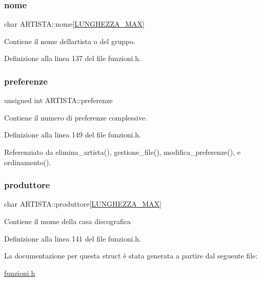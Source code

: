 \subsubsection{\texorpdfstring{nome}{nome}}
{\footnotesize\ttfamily char A\+R\+T\+I\+S\+T\+A\+::nome\mbox{[}\hyperlink{funzioni_8h_a2cdd71b92d6e869f8b094e32a6da6a62}{L\+U\+N\+G\+H\+E\+Z\+Z\+A\+\_\+\+M\+AX}\mbox{]}}

Contiene il nome dell\textquotesingle{}artista o del gruppo. 

Definizione alla linea 137 del file funzioni.\+h.

\mbox{\label{struct_a_r_t_i_s_t_a_a864c672ed1a5c81d1daf02093e11eb05}} 
\subsubsection{\texorpdfstring{preferenze}{preferenze}}
{\footnotesize\ttfamily unsigned int A\+R\+T\+I\+S\+T\+A\+::preferenze}

Contiene il numero di preferenze complessive. 

Definizione alla linea 149 del file funzioni.\+h.



Referenziato da elimina\+\_\+artista(), gestione\+\_\+file(), modifica\+\_\+preferenze(), e ordinamento().

\mbox{\label{struct_a_r_t_i_s_t_a_a444c256b4120246fcbf1804377e61e32}} 
\subsubsection{\texorpdfstring{produttore}{produttore}}
{\footnotesize\ttfamily char A\+R\+T\+I\+S\+T\+A\+::produttore\mbox{[}\hyperlink{funzioni_8h_a2cdd71b92d6e869f8b094e32a6da6a62}{L\+U\+N\+G\+H\+E\+Z\+Z\+A\+\_\+\+M\+AX}\mbox{]}}

Contiene il mome della casa discografica 

Definizione alla linea 141 del file funzioni.\+h.



La documentazione per questa struct è stata generata a partire dal seguente file\+:\begin{DoxyCompactItemize}
\item 
\hyperlink{funzioni_8h}{funzioni.\+h}\end{DoxyCompactItemize}
